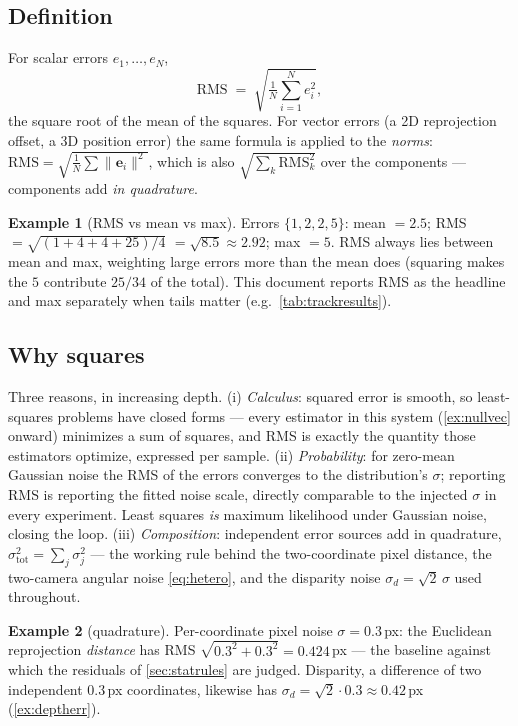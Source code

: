\documentclass[11pt]{article}
\theoremstyle{definition}
\newtheorem{example}{Example}
\newcommand{\vect}[1]{\mathbf{#1}}
\begin{document}
\subsection{Definition}
For scalar errors $e_1,\dots,e_N$,
\begin{equation}
\mathrm{RMS} \;=\; \sqrt{\tfrac1N\textstyle\sum_{i=1}^N e_i^2},
\label{eq:rmsdef}
\end{equation}
the square root of the mean of the squares. For vector errors (a 2D
reprojection offset, a 3D position error) the same formula is applied to
the \emph{norms}: $\mathrm{RMS}=\sqrt{\frac1N\sum\|\vect e_i\|^2}$,
which is also $\sqrt{\sum_k \mathrm{RMS}_k^2}$ over the components ---
components add \emph{in quadrature}.

\begin{example}[RMS vs mean vs max]
\label{ex:rmsbasic}
Errors $\{1,2,2,5\}$: mean $=2.5$; RMS
$=\sqrt{(1+4+4+25)/4}$ $=\sqrt{8.5}\approx2.92$; max $=5$. RMS always lies
between mean and max, weighting large errors more than the mean does
(squaring makes the $5$ contribute $25/34$ of the total). This document
reports RMS as the headline and max separately when tails matter
(e.g.\ \autoref{tab:trackresults}).
\end{example}

\subsection{Why squares}
Three reasons, in increasing depth. (i) \emph{Calculus}: squared error is
smooth, so least-squares problems have closed forms --- every estimator in
this system (\autoref{ex:nullvec} onward) minimizes a sum of squares, and
RMS is exactly the quantity those estimators optimize, expressed per
sample. (ii) \emph{Probability}: for zero-mean Gaussian noise the RMS of
the errors converges to the distribution's $\sigma$; reporting RMS is
reporting the fitted noise scale, directly comparable to the injected
$\sigma$ in every experiment. Least squares \emph{is} maximum likelihood
under Gaussian noise, closing the loop. (iii) \emph{Composition}:
independent error sources add in quadrature,
$\sigma_{\text{tot}}^2=\sum_j\sigma_j^2$ --- the working rule behind the
two-coordinate pixel distance, the two-camera angular noise
\eqref{eq:hetero}, and the disparity noise $\sigma_d=\sqrt2\,\sigma$ used
throughout.

\begin{example}[quadrature]
\label{ex:rmsquad}
Per-coordinate pixel noise $\sigma=0.3$\,px: the Euclidean reprojection
\emph{distance} has RMS $\sqrt{0.3^2+0.3^2}=0.424$\,px --- the baseline
against which the residuals of \autoref{sec:statrules} are judged.
Disparity, a difference of two independent $0.3$\,px coordinates,
likewise has $\sigma_d=\sqrt2\cdot0.3\approx0.42$\,px
(\autoref{ex:deptherr}).
\end{example}
\end{document}
